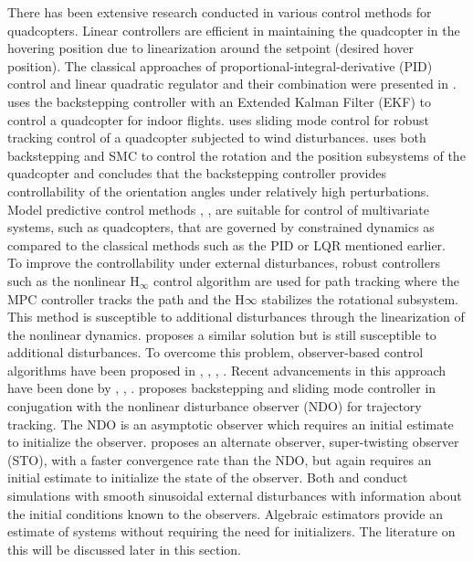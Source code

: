 \documentclass[letterpaper%
, twoside%
, 12pt%
,memoire%
, english%
,creativecommons,hyperref%
]{thETS}
\theoremstyle{newThmStyle}
\begin{document}
\begin{introduction}
There has been extensive research conducted in various control methods for quadcopters. Linear controllers are efficient in maintaining the quadcopter in the hovering position due to linearization around the setpoint (desired hover position). The classical approaches of proportional-integral-derivative (PID) control and linear quadratic regulator and their combination were presented in \citep{RN99}. \citep{RN100} uses the backstepping controller with an Extended Kalman Filter (EKF) to control a quadcopter for indoor flights. \citep{RN102} uses sliding mode control for robust tracking control of a quadcopter subjected to wind disturbances. \citep{RN103} uses both backstepping and SMC to control the rotation and the position subsystems of the quadcopter and concludes that the backstepping controller provides controllability of the orientation angles under relatively high perturbations. Model predictive control methods \citep{RN104}, \citep{RN105}, \citep{RN106} are suitable for control of multivariate systems, such as quadcopters, that are governed by constrained dynamics as compared to the classical methods such as the PID or LQR mentioned earlier. \\
To improve the controllability under external disturbances, robust controllers such as the nonlinear H$_\infty$ control algorithm \citep{RN108} are used for path tracking where the MPC controller tracks the path and the H$\infty$ stabilizes the rotational subsystem. This method is susceptible to additional disturbances through the linearization of the nonlinear dynamics. \citep{RN109} proposes a similar solution but is still susceptible to additional disturbances. To overcome this problem, observer-based control algorithms  have been proposed in \citep{RN110}, \citep{RN111}, \citep{RN112}, \citep{RN113}. Recent advancements in this approach have been done by \citep{RN114}, \citep{RN116}, \citep{RN117}. \citep{RN114} proposes backstepping and sliding mode controller in conjugation with the nonlinear disturbance observer (NDO) for trajectory tracking. The NDO is an asymptotic observer which requires an initial estimate to initialize the observer. \citep{RN117} proposes an alternate observer, super-twisting observer (STO), with a faster convergence rate than the NDO, but again requires an initial estimate to initialize the state of the observer. Both \citep{RN114} and \citep{RN117} conduct simulations with smooth sinusoidal external disturbances with information about the initial conditions known to the observers. 
Algebraic estimators provide an estimate of systems without requiring the need for initializers. The literature on this will be discussed later in this section.\\ 

\end{introduction}
\end{document}
